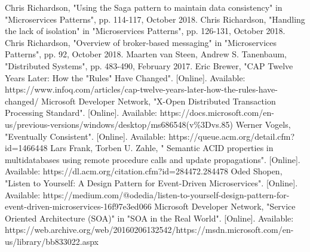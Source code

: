 \documentclass[conference]{IEEEtran}
\begin{document}
\begin{thebibliography}{1}
Chris Richardson, "Using the Saga pattern to maintain data consistency" in "Microservices Patterns", pp. 114-117, October 2018.
Chris Richardson, "Handling the lack of isolation" in "Microservices Patterns", pp. 126-131, October 2018.
Chris Richardson, "Overview of broker-based messaging" in "Microservices Patterns", pp. 92, October 2018.
Maarten van Steen, Andrew S. Tanenbaum, "Distributed Systems", pp. 483-490, February 2017.
Eric Brewer, "CAP Twelve Years Later: How the "Rules" Have Changed". [Online]. Available: https://www.infoq.com/articles/cap-twelve-years-later-how-the-rules-have-changed/
Microsoft Developer Network, "X-Open Distributed Transaction Processing Standard". [Online]. Available: https://docs.microsoft.com/en-us/previous-versions/windows/desktop/ms686548(v\%3Dvs.85)
Werner Vogels, "Eventually Consistent". [Online]. Available: https://queue.acm.org/detail.cfm?id=1466448
Lars Frank, Torben U. Zahle, "
Semantic ACID properties in multidatabases using remote procedure calls and update propagations". [Online]. Available: https://dl.acm.org/citation.cfm?id=284472.284478
Oded Shopen, "Listen to Yourself: A Design Pattern for Event-Driven Microservices". [Online]. Available: https://medium.com/@odedia/listen-to-yourself-design-pattern-for-event-driven-microservices-16f97e3ed066
Microsoft Developer Network, "Service Oriented Architecture (SOA)" in "SOA in the Real World". [Online]. Available: https://web.archive.org/web/20160206132542/https://msdn.microsoft.com/en-us/library/bb833022.aspx

\end{thebibliography}




\end{document}
